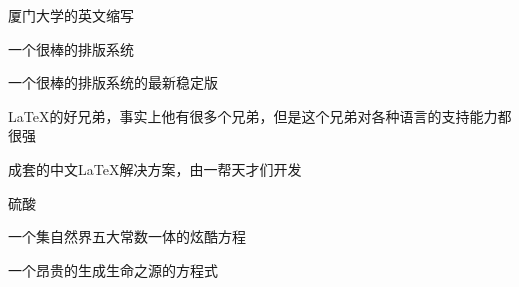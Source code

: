 
\begin{denotation}
	
\item[XMU] 厦门大学的英文缩写
\item[\LaTeX] 一个很棒的排版系统
\item[\LaTeXe] 一个很棒的排版系统的最新稳定版
\item[\XeTeX] \LaTeX{}的好兄弟，事实上他有很多个兄弟，但是这个兄弟对各种语言的支持能力都很强
\item[ctex] 成套的中文\LaTeX{}解决方案，由一帮天才们开发
\item[\ce{H2SO4}] 硫酸
\item[$ e^{\pi{}i}+1=0$] 一个集自然界五大常数一体的炫酷方程
\item[\ce{2H2 + O2 -> 2H2O}] 一个昂贵的生成生命之源的方程式

\end{denotation}

